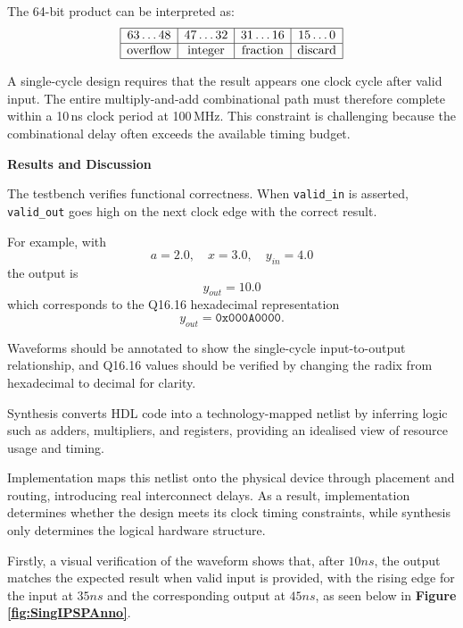 \documentclass[a4paper,12pt]{article}
\begin{document}
The 64-bit product can be interpreted as:
\[
\begin{array}{|c|c|c|c|}
\hline
63\ldots48 & 47\ldots32 & 31\ldots16 & 15\ldots0 \\
\hline
\text{overflow} & \text{integer} & \text{fraction} & \text{discard} \\
\hline
\end{array}
\]

A single-cycle design requires that the result appears one clock cycle after valid input. The entire multiply-and-add combinational path must therefore complete within a 10\,ns clock period at 100\,MHz. This constraint is challenging because the combinational delay often exceeds the available timing budget.

\textbf{Results and Discussion}

The testbench verifies functional correctness. When \texttt{valid\_in} is asserted, \texttt{valid\_out} goes high on the next clock edge with the correct result.

For example, with
\begin{equation}
a = 2.0, \quad x = 3.0, \quad y_{in} = 4.0
\end{equation}
the output is
\begin{equation}
y_{out} = 10.0
\end{equation}
which corresponds to the Q16.16 hexadecimal representation
\begin{equation}
y_{out} = \texttt{0x000A0000}.
\end{equation}

Waveforms should be annotated to show the single-cycle input-to-output relationship, and Q16.16 values should be verified by changing the radix from hexadecimal to decimal for clarity.

Synthesis converts HDL code into a technology-mapped netlist by inferring logic such as adders, multipliers, and registers, providing an idealised view of resource usage and timing. 

Implementation maps this netlist onto the physical device through placement and routing, introducing real interconnect delays. As a result, implementation determines whether the design meets its clock timing constraints, while synthesis only determines the logical hardware structure.

Firstly, a visual verification of the waveform shows that, after $10ns$, the output matches the expected result when valid input is provided, with the rising edge for the input at $35ns$ and the corresponding output at $45ns$, as seen below in \textbf{Figure \ref{fig:SingIPSPAnno}}.
\end{document}
